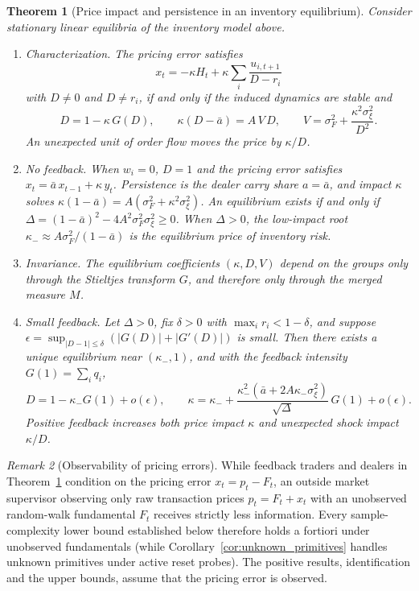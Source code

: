 \documentclass[12pt]{article}
\newtheorem{theorem}{Theorem}[section]
\theoremstyle{definition}
\theoremstyle{remark}
\newtheorem{remark}[theorem]{Remark}
\begin{document}
\begin{theorem}[Price impact and persistence in an inventory equilibrium]\label{n:thm_inventory}
Consider stationary linear equilibria of the inventory model above.
\begin{enumerate}[label=(\roman*),itemsep=1pt]
\item \emph{Characterization.} The pricing error satisfies
\[
 x_t=-\kappa H_t+\kappa\sum_i\frac{u_{i,t+1}}{D-r_i}
\]
with $D\ne0$ and $D\ne r_i$, if and only if the induced dynamics are stable and
\begin{equation}\label{n:eq:inventory_eq}
 D=1-\kappa\,G(D),\qquad \kappa(D-\bar a)=A\,V\,D,\qquad V=\sigma_F^2+\frac{\kappa^2\sigma_\xi^2}{D^2}.
\end{equation}
An unexpected unit of order flow moves the price by $\kappa/D$.
\item \emph{No feedback.} When $w_i=0$, $D=1$ and the pricing error satisfies $x_t=\bar a\,x_{t-1}+\kappa\,y_t$. Persistence is the dealer carry share $a=\bar a$, and impact $\kappa$ solves $\kappa(1-\bar a)=A(\sigma_F^2+\kappa^2\sigma_\xi^2)$. An equilibrium exists if and only if $\Delta=(1-\bar a)^2-4A^2\sigma_F^2\sigma_\xi^2\ge0$. When $\Delta>0$, the low-impact root $\kappa_-\approx A\sigma_F^2/(1-\bar a)$ is the equilibrium price of inventory risk.
\item \emph{Invariance.} The equilibrium coefficients $(\kappa,D,V)$ depend on the groups only through the Stieltjes transform $G$, and therefore only through the merged measure $M$.
\item \emph{Small feedback.} Let $\Delta>0$, fix $\delta>0$ with $\max_ir_i<1-\delta$, and suppose $\epsilon=\sup_{|D-1|\le\delta}(|G(D)|+|G'(D)|)$ is small. Then there exists a unique equilibrium near $(\kappa_-,1)$, and with the feedback intensity $G(1)=\sum_i q_i$,
\[
 D=1-\kappa_-G(1)+o(\epsilon),\qquad \kappa=\kappa_-+\frac{\kappa_-^2(\bar a+2A\kappa_-\sigma_\xi^2)}{\sqrt\Delta}\,G(1)+o(\epsilon).
\]
Positive feedback increases both price impact $\kappa$ and unexpected shock impact $\kappa/D$.
\end{enumerate}
\end{theorem}

\begin{remark}[Observability of pricing errors]\label{n:rem_observability}
While feedback traders and dealers in Theorem~\ref{n:thm_inventory} condition on the pricing error $x_t = p_t - F_t$, an outside market supervisor observing only raw transaction prices $p_t = F_t + x_t$ with an unobserved random-walk fundamental $F_t$ receives strictly less information. Every sample-complexity lower bound established below therefore holds a fortiori under unobserved fundamentals (while Corollary~\ref{cor:unknown_primitives} handles unknown primitives under active reset probes). The positive results, identification and the upper bounds, assume that the pricing error is observed.
\end{remark}
\end{document}
